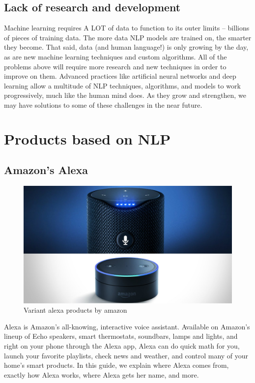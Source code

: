 \documentclass[11pt]{article}
\begin{document}
\subsection{Lack of research and development}
\label{sec:org70f0756}
Machine learning requires A LOT of data to function to its outer limits – billions
of pieces of training data. The more data NLP models are trained on, the smarter
they become. That said, data (and human language!) is only growing by the day, as
are new machine learning techniques and custom algorithms. All of the problems above
will require more research and new techniques in order to improve on them.
Advanced practices like artificial neural networks and deep learning allow a multitude
of NLP techniques, algorithms, and models to work progressively, much like the human
mind does. As they grow and strengthen, we may have solutions to some of these
challenges in the near future.
\clearpage

\section{Products based on NLP}
\label{sec:org20a1a36}
\subsection{Amazon's Alexa}
\label{sec:orgc066ef5}
\begin{figure}[htbp]
\centering
\includegraphics[width=.9\linewidth]{./img/alexa.png}
\caption{\label{fig:org6ca0b34}Variant alexa products by amazon}
\end{figure}
Alexa is Amazon’s all-knowing, interactive voice assistant. Available on Amazon’s
lineup of Echo speakers, smart thermostats, soundbars, lamps and lights, and right
on your phone through the Alexa app, Alexa can do quick math for you, launch your
favorite playlists, check news and weather, and control many of your home’s smart products.
In this guide, we explain where Alexa comes from, exactly how Alexa works, where
Alexa gets her name, and more.
\end{document}
